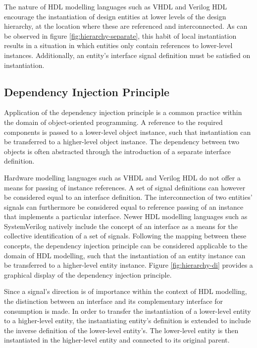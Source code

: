 \documentclass{article}
\begin{document}
The nature of HDL modelling languages such as VHDL and Verilog HDL encourage the instantiation of design entities at lower levels of the design hierarchy, at the location where these are referenced and interconnected. As can be observed in figure \ref{fig:hierarchy-separate}, this habit of local instantiation results in a situation in which entities only contain references to lower-level instances. Additionally, an entity's interface signal definition must be satisfied on instantiation.

\subsection{Dependency Injection Principle}
\label{section:dip}
Application of the dependency injection principle is a common practice within the domain of object-oriented programming. A reference to the required components is passed to a lower-level object instance, such that instantiation can be transferred to a higher-level object instance. The dependency between two objects is often abstracted through the introduction of a separate interface definition. 

Hardware modelling languages such as VHDL and Verilog HDL do not offer a means for passing of instance references. A set of signal definitions can however be considered equal to an interface definition. The interconnection of two entities' signals can furthermore be considered equal to reference passing of an instance that implements a particular interface. Newer HDL modelling languages such as SystemVerilog natively include the concept of an interface as a means for the collective identification of a set of signals. Following the mapping between these concepts, the dependency injection principle can be considered applicable to the domain of HDL modelling, such that the instantiation of an entity instance can be transferred to a higher-level entity instance. Figure \ref{fig:hierarchy-di} provides a graphical display of the dependency injection principle. 

Since a signal's direction is of importance within the context of HDL modelling, the distinction between an interface and its complementary interface for consumption is made. In order to transfer the instantiation of a lower-level entity to a higher-level entity, the instantiating entity's definition is extended to include the inverse definition of the lower-level entity's. The lower-level entity is then instantiated in the higher-level entity and connected to its original parent.
\end{document}
